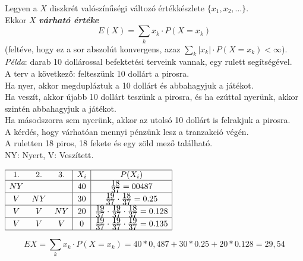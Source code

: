 \documentclass[tikz,12pt,margin=0px]{article}
\newcommand\ddfrac[2]{\frac{\displaystyle #1}{\displaystyle #2}}
\begin{document}
    \noindent Legyen a $X$ diszkrét valószínűségi változó értékkészlete $\{x_1, x_2, \ldots\}$.\\
    Ekkor $X$ \emph{\textbf{várható értéke}}
    \[
        E(X) = \sum\limits_{k}x_k \cdot P(X = x_k)
    \]
    (feltéve, hogy ez a sor abszolút konvergens, azaz $\sum\limits_{k}\big|x_k\big| \cdot P(X = x_k) < \infty$).\\

    \noindent \emph{Példa}:
     darab 10 dollárossal befektetési terveink vannak, egy rulett segítségével. \\
    A terv a következő: felteszünk 10 dollárt a pirosra.\\

    \noindent Ha nyer, akkor megdupláztuk a 10 dollárt és abbahagyjuk a játékot.\\
    \noindent Ha veszít, akkor újabb 10 dollárt teszünk a pirosra, és ha ezúttal nyerünk, akkor szintén abbahagyjuk a játékot.\\
    \noindent Ha másodszorra sem nyerünk, akkor az utolsó 10 dollárt is felrakjuk a pirosra.\\

    \noindent A kérdés, hogy várhatóan mennyi pénzünk lesz a tranzakció végén.\\

    \noindent A ruletten 18 piros, 18 fekete és egy zöld mező található.\\
    \noindent NY: Nyert, V: Veszített.

    \begin{center}
    \renewcommand{\arraystretch}{2}
    $\begin{array}{|ccc|c|c|}
        \hline
        1. & 2. & 3. & X_i & P(X_i) \\ \hline
        NY &  &  & 40 & \ddfrac{18}{37} = 00487 \\ \hline
        V & NY &  & 30 & \ddfrac{19}{37} \cdot \ddfrac{18}{37} = 0.25 \\ \hline
        V & V & NY & 20 & \ddfrac{19}{37} \cdot\ddfrac{19}{37} \cdot\ddfrac{18}{37} = 0.128 \\ \hline
        V & V & V & 0 & \ddfrac{19}{37} \cdot\ddfrac{19}{37} \cdot\ddfrac{19}{37} = 0.135 \\ \hline
    \end{array}$
    \renewcommand{\arraystretch}{1}
    \end{center}
    \[
        EX = \sum\limits_{k}x_k \cdot P(X = x_k) = 40 * 0,487 + 30 * 0.25 + 20 * 0.128 = 29,54
    \]
	
\end{document}

